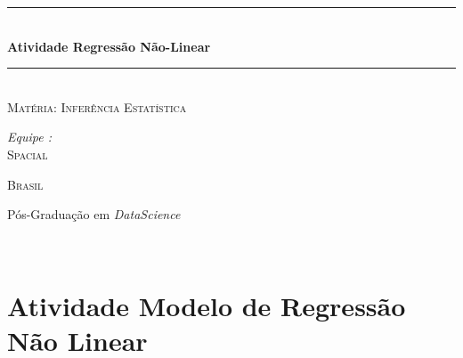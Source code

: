 \documentclass[a4paper,12pt]{article}
\newcommand{\HRule}{\rule{\linewidth}{0.5mm}}
\begin{document}
    \begin{titlepage}
        \begin{sffamily}
            \begin{center}
                \vspace{5cm}

                \HRule \\[0.4cm]
                { \huge \bfseries Atividade Regressão Não-Linear\\[0.4cm] }

                \HRule \\[2cm]

                \textsc{\LARGE Matéria: Inferência Estatística}\\[1cm]
                \begin{minipage}{0.4\textwidth}
                    \begin{flushleft} \large
                    \emph{Equipe :} \\
                    \textsc{Spacial}\\
                    \end{flushleft}
                \end{minipage}
                \begin{minipage}{0.4\textwidth}
                    \begin{flushright} \large
                    \textsc{Brasil}
                    \end{flushright}
                \end{minipage}

                \vfill

                {\large Pós-Graduação em \textit{DataScience}}

            \end{center}
        \end{sffamily}
        \doclicenseThis
    \end{titlepage}
    \newpage

    \renewcommand{\headrulewidth}{1pt}
    \fancyfoot[C]{\thepage/\pageref{LastPage}}
    {\ \vspace{-0.51cm}}

    \tableofcontents
\section{Atividade Modelo de Regressão Não Linear}
\end{document}
